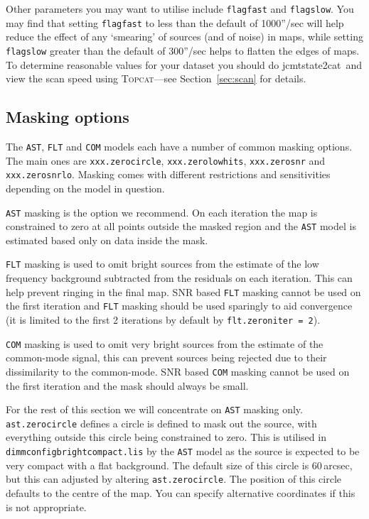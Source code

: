 \documentclass[twoside,11pt]{article}
\newcommand{\htmladdnormallink}[2]{#1}
\newcommand{\htmlref}[2]{#1}
\newcommand{\latexhtml}[2]{#1}
\newcommand{\xref}[3]{#1}
\newcommand{\xlabel}[1]{}
\renewcommand{\_}{\texttt{\symbol{95}}}
\newcommand{\topcat}{\htmladdnormallink{\textsc{Topcat}}{http://www.starlink.ac.uk/topcat}}
\newcommand{\task}[1]{\textsf{#1}}
\newcommand{\jcmtstate}{\xref{\task{jcmtstate2cat}}{sun258}{JCMTSTATE2CAT}}
\newcommand{\cref}[3]{\latexhtml{#1~\ref{#2}}{\htmlref{#3}{#2}}}
\begin{document}
Other parameters you may want to utilise include \texttt{flagfast} and
\texttt{flagslow}. You may find that setting \texttt{flagfast} to less
than the default of 1000''/sec will help reduce the effect of any
`smearing' of sources (and of noise) in maps, while setting \texttt{flagslow} greater
than the default of 300''/sec helps to flatten the edges of maps. To
determine reasonable values for your dataset you should do \jcmtstate\
and view the scan speed using \topcat---see
\cref{Section}{sec:scan}{Displaying scan patterns} for details.

\subsection{\xlabel{mask}Masking options}
\label{sec:mask}

The \texttt{AST}, \texttt{FLT} and \texttt{COM} models each have a
number of common masking options. The main ones are
\texttt{xxx.zero\_circle}, \texttt{xxx.zero\_lowhits},
\texttt{xxx.zero\_snr} and \texttt{xxx.zero\_snrlo}. Masking comes
with different restrictions and sensitivities depending on the model
in question.

\texttt{AST} masking is the option we recommend. On each iteration the
map is constrained to zero at all points outside the masked region and
the \texttt{AST} model is estimated based only on data inside the
mask.

\texttt{FLT} masking is used to omit bright sources from the estimate
of the low frequency background subtracted from the residuals on each
iteration. This can help prevent ringing in the final map. SNR based
\texttt{FLT} masking cannot be used on the first iteration and
\texttt{FLT} masking should be used sparingly to aid convergence (it
is limited to the first 2 iterations by default by
\texttt{flt.zero\_niter = 2}).

\texttt{COM} masking is used to omit very bright sources from the
estimate of the common-mode signal, this can prevent sources being
rejected due to their dissimilarity to the common-mode. SNR based
\texttt{COM} masking cannot be used on the first iteration and the
mask should always be small.

For the rest of this section we will concentrate on \texttt{AST}
masking only. \texttt{ast.zero\_circle} defines a circle is defined to
mask out the source, with everything outside this circle being
constrained to zero. This is utilised in
\texttt{dimmconfig\_bright\_compact.lis} by the \texttt{AST} model as
the source is expected to be very compact with a flat background. The
default size of this circle is 60\,arcsec, but this can adjusted by
altering \texttt{ast.zero\_circle}. The position of this circle
defaults to the centre of the map. You can specify alternative
coordinates if this is not appropriate.
\end{document}
